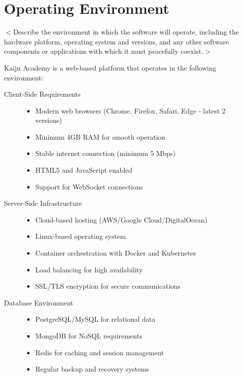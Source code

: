 \documentclass[a4paper, 11pt]{scrreprt}
\begin{document}
\section{Operating Environment}
$<$Describe the environment in which the software will operate, including the 
hardware platform, operating system and versions, and any other software 
components or applications with which it must peacefully coexist.$>$ 

Kaiju Academy is a web-based platform that operates in the following environment:

\begin{description}
    \item[Client-Side Requirements]
        \begin{itemize}
            \item Modern web browsers (Chrome, Firefox, Safari, Edge - latest 2 versions)
            \item Minimum 4GB RAM for smooth operation
            \item Stable internet connection (minimum 5 Mbps)
            \item HTML5 and JavaScript enabled
            \item Support for WebSocket connections
        \end{itemize}
    
    \item[Server-Side Infrastructure]
        \begin{itemize}
            \item Cloud-based hosting (AWS/Google Cloud/DigitalOcean)
            \item Linux-based operating system
            \item Container orchestration with Docker and Kubernetes
            \item Load balancing for high availability
            \item SSL/TLS encryption for secure communications
        \end{itemize}
    
    \item[Database Environment]
        \begin{itemize}
            \item PostgreSQL/MySQL for relational data
            \item MongoDB for NoSQL requirements
            \item Redis for caching and session management
            \item Regular backup and recovery systems
        \end{itemize}
    

\end{description}
\end{document}
